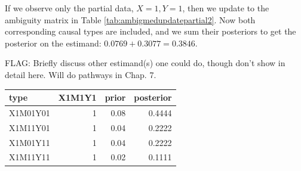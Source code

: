 \documentclass[12pt,]{book}
\begin{document}
If we observe only the partial data, \(X=1, Y=1\), then we update to the ambiguity matrix in Table \ref{tab:ambigmedupdatepartial2}. Now both corresponding causal types are included, and we sum their posteriors to get the posterior on the estimand: \(0.0769 + 0.3077 = 0.3846\).

FLAG: Briefly discuss other estimand(s) one could do, though don't show in detail here. Will do pathways in Chap. 7.

\begin{tabular}{l|r|r|r}
\hline
type & X1M1Y1 & prior & posterior\\
\hline
X1M01Y01 & 1 & 0.08 & 0.4444\\
\hline
X1M11Y01 & 1 & 0.04 & 0.2222\\
\hline
X1M01Y11 & 1 & 0.04 & 0.2222\\
\hline
X1M11Y11 & 1 & 0.02 & 0.1111\\
\hline
\end{tabular}
\end{document}
